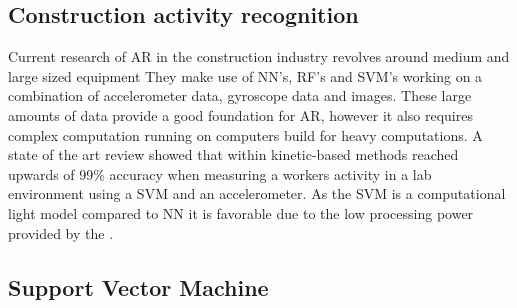 \subsection{Construction activity recognition}
Current research of AR in the construction industry revolves around medium and large sized equipment \cite{soaWorkersAndEquipment, activityAudioSVM, timeseriesDataAugmentationConstruction}
They make use of NN's, RF's and SVM's working on a combination of accelerometer data, gyroscope data and images. These large amounts of data provide a good foundation for AR, however it also requires complex computation running on computers build for heavy computations.
A state of the art review showed that within kinetic-based methods reached upwards of 99\% accuracy when measuring a workers activity in a lab environment using a SVM and an accelerometer.
As the SVM is a computational light model compared to NN \cite{comparisonMLAlgorithms} it is favorable due to the low processing power provided by the \kin.

\subsection{Support Vector Machine} 
